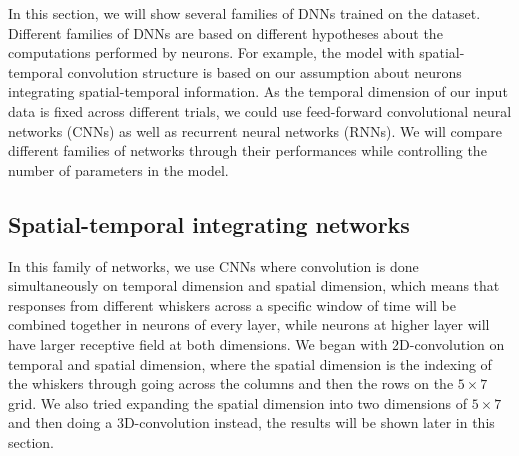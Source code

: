 In this section, we will show several families of DNNs trained on the dataset. Different families of DNNs are based on different hypotheses about the computations performed by neurons.
For example, the model with spatial-temporal convolution structure is based on our assumption about neurons integrating spatial-temporal information.
As the temporal dimension of our input data is fixed across different trials, we could use feed-forward convolutional neural networks (CNNs) as well as recurrent neural networks (RNNs).
We will compare different families of networks through their performances while controlling the number of parameters in the model.

\subsection{Spatial-temporal integrating networks}

In this family of networks, we use CNNs where convolution is done simultaneously on temporal dimension and spatial dimension, which means that responses from different whiskers across a specific window of time will be combined together in neurons of every layer, while neurons at higher layer will have larger receptive field at both dimensions.
We began with 2D-convolution on temporal and spatial dimension, where the spatial dimension is the indexing of the whiskers through going across the columns and then the rows on the $5\times7$ grid.
We also tried expanding the spatial dimension into two dimensions of $5\times7$ and then doing a 3D-convolution instead, the results will be shown later in this section.

